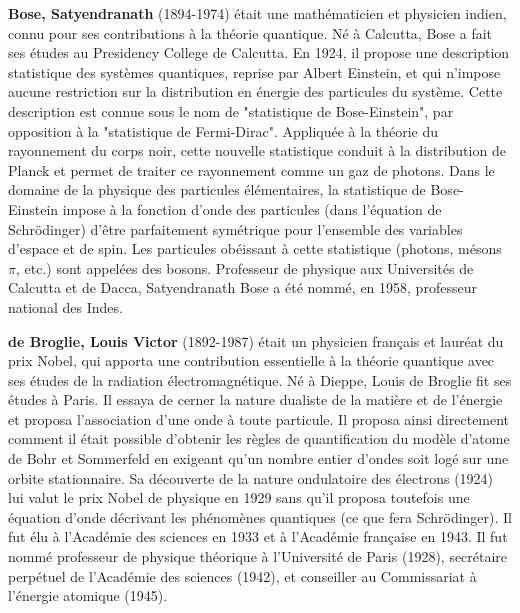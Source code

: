 \textbf{Bose, Satyendranath} (1894-1974)  était une mathématicien et physicien indien, connu pour ses contributions à la théorie quantique. Né à Calcutta, Bose a fait ses études au Presidency College de Calcutta. En 1924, il propose une description statistique des systèmes quantiques, reprise par Albert Einstein, et qui n'impose aucune restriction sur la distribution en énergie des particules du système. Cette description est connue sous le nom de "statistique de Bose-Einstein", par opposition à la "statistique de Fermi-Dirac". Appliquée à la théorie du rayonnement du corps noir, cette nouvelle statistique conduit à la distribution de Planck et permet de traiter ce rayonnement comme un gaz de photons. Dans le domaine de la physique des particules élémentaires, la statistique de Bose-Einstein impose à la fonction d'onde des particules (dans l'équation de Schrödinger) d'être parfaitement symétrique pour l'ensemble des variables d'espace et de spin. Les particules obéissant à cette statistique (photons, mésons $\pi$, etc.) sont appelées des bosons. Professeur de physique aux Universités de Calcutta et de Dacca, Satyendranath Bose a été nommé, en 1958, professeur national des Indes.

\textbf{de Broglie, Louis Victor} (1892-1987) était un physicien français et lauréat du prix Nobel, qui apporta une contribution essentielle à la théorie quantique avec ses études de la radiation électromagnétique. Né à Dieppe, Louis de Broglie fit ses études à Paris. Il essaya de cerner la nature dualiste de la matière et de l'énergie et proposa l'association d'une onde à toute particule. Il proposa ainsi directement comment il était possible d'obtenir les règles de quantification du modèle d'atome de Bohr et Sommerfeld en exigeant qu'un nombre entier d'ondes soit logé sur une orbite stationnaire. Sa découverte de la nature ondulatoire des électrons (1924) lui valut le prix Nobel de physique en 1929 sans qu'il proposa toutefois une équation d'onde décrivant les phénomènes quantiques (ce que fera Schrödinger). Il fut élu à l'Académie des sciences en 1933 et à l'Académie française en 1943. Il fut nommé professeur de physique théorique à l'Université de Paris (1928), secrétaire perpétuel de l'Académie des sciences (1942), et conseiller au Commissariat à l'énergie atomique (1945).

